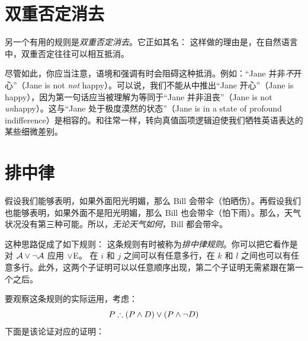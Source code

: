 \section{双重否定消去}
另一个有用的规则是\emph{双重否定消去}。它正如其名：
这样做的理由是，在自然语言中，双重否定往往可以相互抵消。

尽管如此，你应当注意，语境和强调有时会阻碍这种抵消。例如：“Jane 并非\emph{不}开心”（Jane is not \emph{not} happy）。可以说，我们不能从中推出“Jane 开心”（Jane is happy），因为第一句话应当被理解为等同于“Jane 并非沮丧”（Jane is not \emph{un}happy）。这与“Jane 处于极度漠然的状态”（Jane is in a state of profound indifference）是相容的。和往常一样，转向真值函项逻辑迫使我们牺牲英语表达的某些细微差别。

\section{排中律}

假设我们能够表明，如果外面阳光明媚，那么 Bill 会带伞（怕晒伤）。再假设我们也能够表明，如果外面不是阳光明媚，那么 Bill 也会带伞（怕下雨）。那么，天气状况没有第三种可能。所以，\emph{无论天气如何}，Bill 都会带伞。

这种思路促成了如下规则：
这条规则有时被称为\emph{排中律规则}。你可以把它看作是对 $\mathcal{A} \vee \neg \mathcal{A}$ 应用 $\vee$E。
在 $i$ 和 $j$ 之间可以有任意多行，在 $k$ 和 $l$ 之间也可以有任意多行。此外，这两个子证明可以以任意顺序出现，第二个子证明无需紧跟在第一个之后。

要观察这条规则的实际运用，考虑：
	$$P \therefore (P \eand D) \eor (P \eand \enot D)$$
下面是该论证对应的证明：


\begin{fitchproof}
		\PR
		\open
			\AS
		\close
		\open
			\AS
		\close
	\end{fitchproof}


